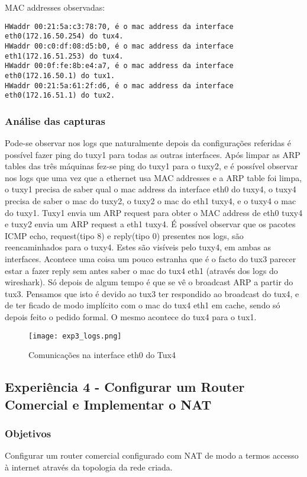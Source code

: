 \documentclass[a4paper]{article}
\begin{document}
MAC addresses observadas:
\begin{verbatim}
HWaddr 00:21:5a:c3:78:70, é o mac address da interface eth0(172.16.50.254) do tux4.
HWaddr 00:c0:df:08:d5:b0, é o mac address da interface eth1(172.16.51.253) do tux4.
HWaddr 00:0f:fe:8b:e4:a7, é o mac address da interface eth0(172.16.50.1) do tux1.
HWaddr 00:21:5a:61:2f:d6, é o mac address da interface eth0(172.16.51.1) do tux2.
\end{verbatim}

\subsubsection{Análise das capturas}
Pode-se observar nos logs que naturalmente depois da configurações referidas é
possível fazer ping do tuxy1 para todas as outras interfaces. Após limpar as
ARP tables das três máquinas fez-se ping do tuxy1 para o tuxy2, e é possível
observar nos logs que uma vez que a ethernet usa MAC addresses e a ARP table
foi limpa, o tuxy1 precisa de saber qual o mac address da interface eth0 do
tuxy4, o tuxy4 precisa de saber o mac do tuxy2, o tuxy2 o mac do eth1 tuxy4, e
o tuxy4 o mac do tuxy1. Tuxy1 envia um ARP request para obter o MAC address de
eth0 tuxy4 e tuxy2 envia um ARP request a eth1 tuxy4. É possível observar que
os pacotes ICMP echo, request(tipo 8) e reply(tipo 0) presentes nos logs, são
reencaminhados para o tuxy4. Estes são visíveis pelo tuxy4, em ambas as
interfaces. Acontece uma coisa um pouco estranha que é o facto do tux3 parecer
estar a fazer reply sem antes saber o mac do tux4 eth1 (através dos logs do
wireshark). Só depois de algum tempo é que se vê o broadcast ARP a partir do
tux3. Pensamos que isto é devido ao tux3 ter respondido ao broadcast do tux4, e
de ter ficado de modo implícito com o mac do tux4 eth1 em cache, sendo só
depois feito o pedido formal. O mesmo acontece do tux4 para o tux1.

\begin{figure}[h]
    \centering
    \texttt{[image: exp3\_logs.png]}
    \caption{Comunicações na interface eth0 do Tux4}
\end{figure}

\subsection{Experiência 4 - Configurar um Router Comercial e Implementar o NAT}

\subsubsection{Objetivos}
Configurar um router comercial configurado com NAT de modo a termos accesso à
internet através da topologia da rede criada.
\end{document}
